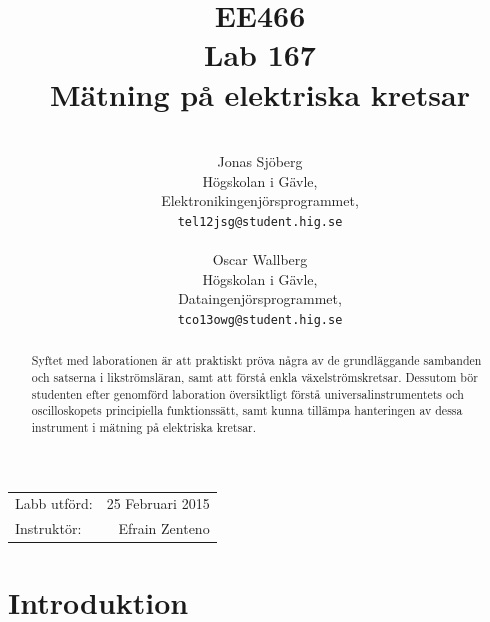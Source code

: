 \documentclass[11pt,a4paper]{article}
\title{EE466 \\ Lab 167 \\ Mätning på elektriska kretsar}
\author{\\
  Jonas Sjöberg\\
  Högskolan i Gävle,\\
  Elektronikingenjörsprogrammet,\\
  \texttt{tel12jsg@student.hig.se}\\
  \\
  Oscar Wallberg\\
  Högskolan i Gävle,\\
  Dataingenjörsprogrammet,\\
  \texttt{tco13owg@student.hig.se}\\}
\date{}
\begin{document}
\maketitle

\begin{center}
    \begin{tabular}{l r}
        Labb utförd: & 25 Februari 2015 \\
        Instruktör: & Efrain Zenteno
    \end{tabular}
\end{center}

\begin{abstract}
    Syftet med laborationen är att praktiskt pröva några av de grundläggande
    sambanden och satserna i likströmsläran, samt att förstå enkla
    växelströmskretsar. Dessutom bör studenten efter genomförd laboration
    översiktligt förstå universalinstrumentets och oscilloskopets principiella
    funktionssätt, samt kunna tillämpa hanteringen av dessa instrument i
    mätning på elektriska kretsar.
\end{abstract}

\newpage

{
    \setcounter{tocdepth}{3}
    \tableofcontents
}

\newpage

\section{Introduktion}\label{setup}


\end{document}
